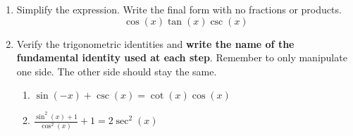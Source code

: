 


\begin{enumerate}
\item  Simplify the expression.  Write the final form with no fractions or products.
$$\cos(x)\tan(x)\csc(x)$$

\vfill

\item Verify the trigonometric identities and \textbf{write the name of the fundamental identity used at each step}. Remember to only manipulate one side.  The other side should stay the same.

\begin{enumerate}
\item  $\sin(-x)+\csc(x)=\cot(x)\cos(x)$\vfill
\vfill
\vfill


\clearpage

\item  $\displaystyle \frac{\sin^2(x)+1}{\cos^2(x)}+1=2\sec^2(x)$\vfill
\end{enumerate}

\end{enumerate}


